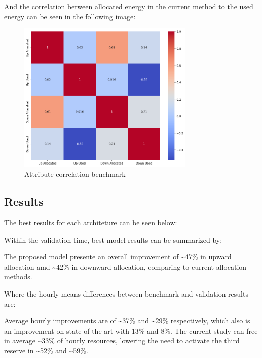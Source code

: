 And the correlation between allocated energy in the current method to the used energy can be seen in the following image:
\begin{figure}[H]
    \centering
    \includegraphics[width=0.75\textwidth]{plots/correlation_heatmap_benchmark.png}
    \caption{Attribute correlation benchmark}
    \label{fig:Attribute_correlation_benchmark}
  \end{figure}

  

\subsection{Results}

The best results for each architeture can be seen below:



Within the validation time, best model results can be summarized by:




The proposed model presente an overall improvement of \textasciitilde47\% in upward allocation amd \textasciitilde42\% in downward allocation, comparing to current allocation methods.\par

Where the hourly means differences between benchmark and validation results are:



Average hourly improvements are of \textasciitilde37\% and \textasciitilde29\% respectively, which also is an improvement on state of the art \cite{Algarvio2024} with 13\% and 8\%.
The current study can free in average \textasciitilde33\% of hourly resources, lowering the need to activate the third reserve in \textasciitilde52\% and \textasciitilde59\%.\par



